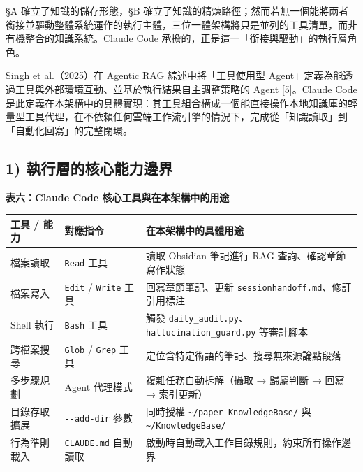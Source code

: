 §A 確立了知識的儲存形態，§B
確立了知識的精煉路徑；然而若無一個能將兩者銜接並驅動整體系統運作的執行主體，三位一體架構將只是並列的工具清單，而非有機整合的知識系統。Claude
Code 承擔的，正是這一「銜接與驅動」的執行層角色。

Singh et al.（2025）在 Agentic RAG 綜述中將「工具使用型
Agent」定義為能透過工具與外部環境互動、並基於執行結果自主調整策略的
Agent {[}5{]}。Claude Code
是此定義在本架構中的具體實現：其工具組合構成一個能直接操作本地知識庫的輕量型工具代理，在不依賴任何雲端工作流引擎的情況下，完成從「知識讀取」到「自動化回寫」的完整閉環。

\subsection{1)
執行層的核心能力邊界}\label{ux57f7ux884cux5c64ux7684ux6838ux5fc3ux80fdux529bux908aux754c}

\textbf{表六：Claude Code 核心工具與在本架構中的用途}

{\def\LTcaptype{none} %
\begin{longtable}[]{@{}
  >{\raggedright\arraybackslash}p{}
  >{\raggedright\arraybackslash}p{}
  >{\raggedright\arraybackslash}p{}@{}}
\toprule\noalign{}
\begin{minipage}[b]{\linewidth}\raggedright
工具 / 能力
\end{minipage} & \begin{minipage}[b]{\linewidth}\raggedright
對應指令
\end{minipage} & \begin{minipage}[b]{\linewidth}\raggedright
在本架構中的具體用途
\end{minipage} \\
\midrule\noalign{}
\endhead
\bottomrule\noalign{}
\endlastfoot
檔案讀取 & \texttt{Read} 工具 & 讀取 Obsidian 筆記進行 RAG
查詢、確認章節寫作狀態 \\
檔案寫入 & \texttt{Edit} / \texttt{Write} 工具 & 回寫章節筆記、更新
\texttt{sessionhandoff.md}、修訂引用標注 \\
Shell 執行 & \texttt{Bash} 工具 & 觸發
\texttt{daily\_audit.py}、\texttt{hallucination\_guard.py} 等審計腳本 \\
跨檔案搜尋 & \texttt{Glob} / \texttt{Grep} 工具 &
定位含特定術語的筆記、搜尋無來源論點段落 \\
多步驟規劃 & Agent 代理模式 & 複雜任務自動拆解（攝取 → 歸屬判斷 → 回寫 →
索引更新） \\
目錄存取擴展 & \texttt{-\/-add-dir} 參數 & 同時授權
\texttt{\textasciitilde{}/paper\_KnowledgeBase/} 與
\texttt{\textasciitilde{}/KnowledgeBase/} \\
行為準則載入 & \texttt{CLAUDE.md} 自動讀取 &
啟動時自動載入工作目錄規則，約束所有操作邊界 \\
\end{longtable}
}

